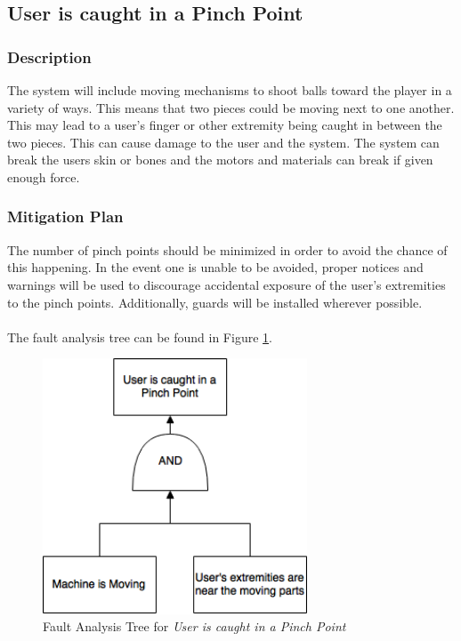 \documentclass[11pt]{article}
\begin{document}
\subsection{User is caught in a Pinch Point}
\subsubsection*{Description}
The system will include moving mechanisms to shoot balls toward the player in a variety of ways. This means that two pieces could be moving next to one another. This may lead to a user's finger or other extremity being caught in between the two pieces. This can cause damage to the user and the system. The system can break the users skin or bones and the motors and materials can break if given enough force.
\subsubsection*{Mitigation Plan}
The number of pinch points should be minimized in order to avoid the chance of this happening. In the event one is unable to be avoided, proper notices and warnings will be used to discourage accidental exposure of the user's extremities to the pinch points. Additionally, guards will be installed wherever possible. \\ \\
The fault analysis tree can be found in Figure \ref{fig:ft-pinch}.

\begin{figure}[H]
   \centering
   \includegraphics[width=0.7\textwidth]{img/ft-pinch.png} %
   \caption{Fault Analysis Tree for \textit{User is caught in a Pinch Point}}
   \label{fig:ft-pinch}
\end{figure}
\end{document}
